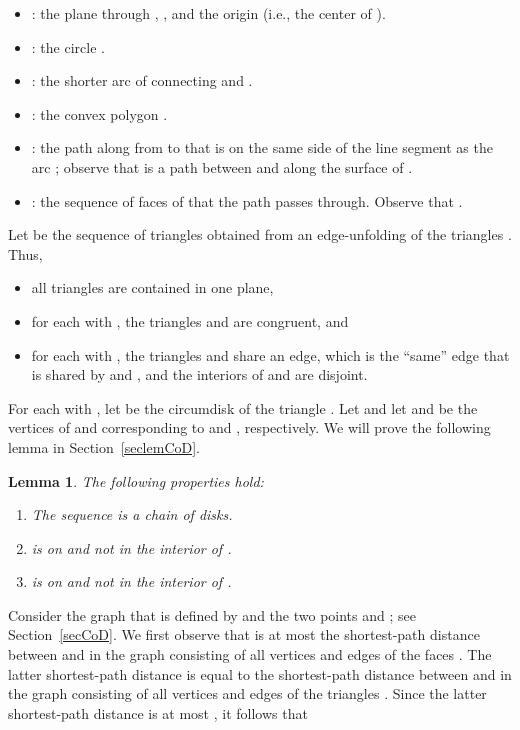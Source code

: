 \documentclass[12pt]{article}
\newtheorem{lemma}{Lemma}
\begin{document}
\begin{itemize} 
\item : the plane through , , and the origin (i.e., the 
      center of ). 
\item : the circle . 
\item : the shorter arc of  connecting  and . 
\item : the convex polygon . 
\item : the path along  from  to  that is on 
      the same side of the line segment  as the arc ; 
      observe that  is a path between  and  along the 
      surface of . 
\item : the sequence of faces of  that the path 
       passes through. Observe that .
\end{itemize} 
Let  be the sequence of triangles obtained from 
an edge-unfolding of the triangles . Thus, 
\begin{itemize}
\item all triangles  are contained in one plane, 
\item for each  with , the triangles  and  
      are congruent, and 
\item for each  with , the triangles  and 
       share an edge, which is the ``same'' edge that is shared 
      by  and , and the interiors of  and  
      are disjoint.  
\end{itemize} 
For each  with , let  be the circumdisk of the 
triangle . Let  and let 
 and  be the vertices of  and  corresponding to  
and , respectively. We will prove the following lemma in 
Section~\ref{seclemCoD}.  

\begin{lemma}  \label{lemCoD}  
The following properties hold: 
\begin{enumerate} 
\item The sequence  is a chain of disks. 
\item  is on  and not in the interior of . 
\item  is on  and not in the interior of .  
\end{enumerate} 
\end{lemma} 

Consider the graph  that is defined by 
 and the two points  and ; see 
Section~\ref{secCoD}. We first observe that  is at most 
the shortest-path distance between  and  in the graph consisting 
of all vertices and edges of the faces . The latter 
shortest-path distance is equal to the shortest-path distance between 
 and  in the graph consisting of all vertices and edges of the 
triangles . Since the latter shortest-path 
distance is at most , it follows that 
 
\end{document}
